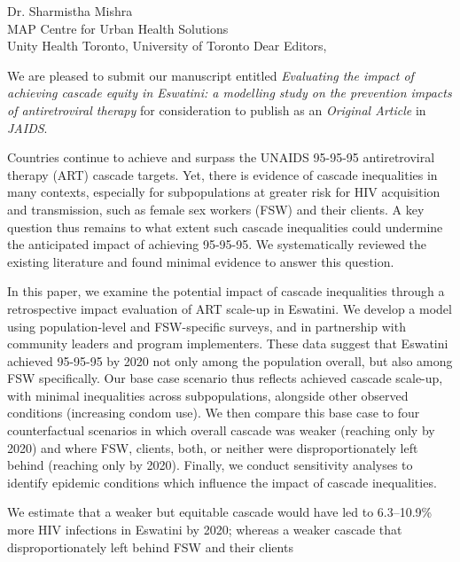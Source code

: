 \address{
  Drs. Paul A. Volberding \& William A. Blattner\\
  Editor-in-Chief\\
  Journal of Acquired Immune Deficiency Syndromes
}{Dr. Sharmistha Mishra\\
  MAP Centre for Urban Health Solutions\\
  Unity Health Toronto, University of Toronto}
Dear Editors,
\par
We are pleased to submit our manuscript entitled
\emph{Evaluating the impact of achieving cascade equity in Eswatini: %
  a modelling study on the prevention impacts of antiretroviral therapy}
for consideration to publish as an \emph{Original Article} in \emph{JAIDS}.
\par
Countries continue to achieve and surpass
the UNAIDS 95-95-95 antiretroviral therapy (ART) cascade targets.
Yet, there is evidence of cascade inequalities in many contexts,
especially for subpopulations at greater risk for HIV acquisition and transmission,
such as female sex workers (FSW) and their clients.
A key question thus remains to what extent
such cascade inequalities could undermine the anticipated impact of achieving 95-95-95.
We systematically reviewed the existing literature
and found minimal evidence to answer this question.
\par
In this paper, we examine the potential impact of cascade inequalities
through a retrospective impact evaluation of ART scale-up in Eswatini.
We develop a model using population-level and FSW-specific surveys,
and in partnership with community leaders and program implementers.
These data suggest that Eswatini achieved 95-95-95 by 2020
not only among the population overall, but also among FSW specifically.
Our base case scenario thus reflects achieved cascade scale-up,
with minimal inequalities across subpopulations,
alongside other observed conditions (\eg increasing condom use).
We then compare this base case to four counterfactual scenarios in which
overall cascade was weaker (reaching only \casmd by 2020) and where
FSW, clients, both, or neither were disproportionately left behind
(reaching only \caslo by 2020).
Finally, we conduct sensitivity analyses to identify epidemic conditions
which influence the impact of cascade inequalities.
\par
We estimate that a weaker but equitable cascade
would have led to 6.3--10.9\% more HIV infections in Eswatini by 2020;
whereas a weaker cascade that disproportionately left behind FSW and their clients
